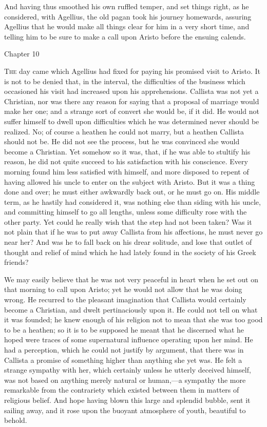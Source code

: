 And having thus smoothed his own ruffled temper, and set things
right, as he considered, with Agellius, the old pagan took his journey
homewards, assuring Agellius that he would make all things clear for
him in a very short time, and telling him to be sure to make a call
upon Aristo before the ensuing calends.

Chapter 10


T\textsc{he} day came which Agellius had fixed for paying his promised
visit to Aristo. It is not to be denied that, in the interval, the
difficulties of the business which occasioned his visit had increased
upon his apprehensions. Callista was not yet a Christian, nor was
there any reason for saying that a proposal of marriage would make her
one; and a strange sort of convert she would be, if it did. He would
not suffer himself to dwell upon difficulties which he was determined
never should be realized. No; of course a heathen he could not marry,
but a heathen Callista should not be. He did not see the process, but
he was convinced she would become a Christian. Yet somehow so it was,
that, if he was able to stultify his reason, he did not quite succeed
to his satisfaction with his conscience. Every morning found him less
satisfied with himself, and more disposed to repent of having allowed
his uncle to enter on the subject with Aristo. But it was a thing done
and over; he must either awkwardly back out, or he must go on. His
middle term, as he hastily had considered it, was nothing else than
siding with his uncle, and committing himself to go all lengths,
unless some difficulty rose with the other party. Yet could he really
wish that the step had not been taken? Was it not plain that if he was
to put away Callista from his affections, he must never go near her?
And was he to fall back on his drear solitude, and lose that outlet of
thought and relief of mind which he had lately found in the society of
his Greek friends?

We may easily believe that he was not very peaceful in heart when
he set out on that morning to call upon Aristo; yet he would not allow
that he was doing wrong. He recurred to the pleasant imagination that
Callista would certainly become a Christian, and dwelt pertinaciously
upon it. He could not tell on what it was founded; he knew enough of
his religion not to mean that she was too good to be a heathen; so it
is to be supposed he meant that he discerned what he hoped were traces
of some supernatural influence operating upon her mind. He had a
perception, which he could not justify by argument, that there was in
Callista a promise of something higher than anything she yet was. He
felt a strange sympathy with her, which certainly unless he utterly
deceived himself, was not based on anything merely natural or human,—a
sympathy the more remarkable from the contrariety which existed
between them in matters of religious belief. And hope having blown
this large and splendid bubble, sent it sailing away, and it rose upon
the buoyant atmosphere of youth, beautiful to behold.

